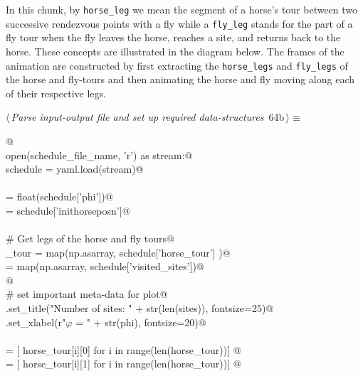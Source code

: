 \documentclass[11.5pt]{report}
\begin{document}
\vspace{-0.8cm} \newchunk In this chunk, by \verb|horse_leg| we mean the segment of a horse's 
tour between two successive rendezvous points with a fly while a \verb|fly_leg| stands for 
the part of a fly tour when the fly leaves the horse, reaches a site, and returns back to the horse. These
concepts are illustrated in the diagram below. The frames of the animation are constructed by first
extracting the \verb|horse_legs| and \verb|fly_legs| of the horse and fly-tours and then 
animating the horse and fly moving along each of their respective legs. 


\begin{flushleft} \small\label{scrap93}\raggedright\small
{} $\langle\,${\itshape Parse input-output file and set up required data-structures}\nobreak\ {\footnotesize {64b}}$\,\rangle\equiv$
\vspace{-1ex}
\begin{list}{}{} \item
\mbox{}\verb@   @\\
\mbox{}\verb@with open(schedule_file_name, 'r') as stream:@\\
\mbox{}\verb@      schedule = yaml.load(stream)@\\
\mbox{}\verb@@\\
\mbox{}\verb@phi           = float(schedule['phi'])@\\
\mbox{}\verb@inithorseposn = schedule['inithorseposn']@\\
\mbox{}\verb@@\\
\mbox{}\verb@# Get legs of the horse and fly tours@\\
\mbox{}\verb@horse_tour  = map(np.asarray, schedule['horse_tour']   )@\\
\mbox{}\verb@sites       = map(np.asarray, schedule['visited_sites'])@\\
\mbox{}\verb@           @\\
\mbox{}\verb@# set important meta-data for plot@\\
\mbox{}\verb@ax.set_title("Number of sites: " + str(len(sites)), fontsize=25)@\\
\mbox{}\verb@ax.set_xlabel(r"$\varphi$ = " + str(phi), fontsize=20)@\\
\mbox{}\verb@@\\
\mbox{}\verb@xhs = [ horse_tour[i][0] for i in range(len(horse_tour))]    @\\
\mbox{}\verb@yhs = [ horse_tour[i][1] for i in range(len(horse_tour))]    @\\

\end{list}
\end{flushleft}
\end{document}
